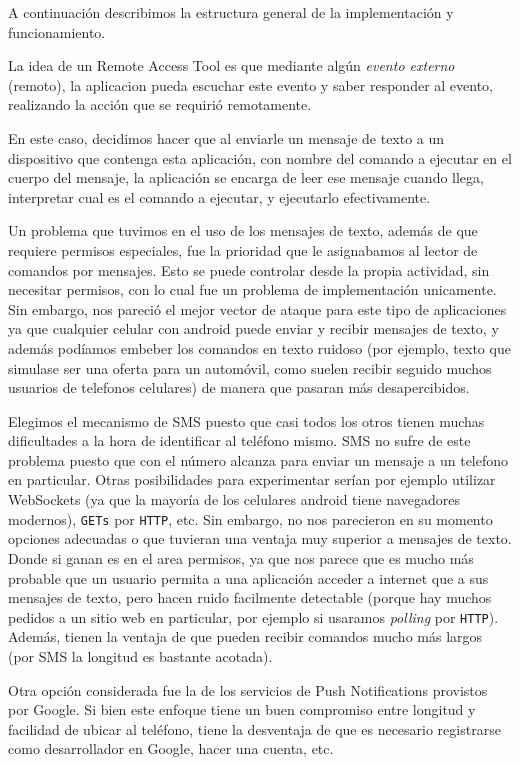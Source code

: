 A continuación describimos la estructura general de la implementación y funcionamiento.

La idea de un Remote Access Tool es que mediante algún \emph{evento externo} (remoto), la aplicacion pueda escuchar este evento y saber responder al evento, realizando la acción que se requirió remotamente.

En este caso, decidimos hacer que al enviarle un mensaje de texto a un dispositivo que contenga esta aplicación, con nombre del comando a ejecutar en el cuerpo del mensaje, la aplicación se encarga de leer ese mensaje cuando llega, interpretar cual es el comando a ejecutar, y ejecutarlo efectivamente.

Un problema que tuvimos en el uso de los mensajes de texto, además de que requiere permisos especiales, fue la prioridad que le asignabamos al
lector de comandos por mensajes. Esto se puede controlar desde la propia actividad, sin necesitar permisos, con lo cual fue un problema de implementación unicamente. Sin embargo, nos pareció el mejor vector de ataque para este tipo de aplicaciones ya que cualquier celular con
android puede enviar y recibir mensajes de texto, y además podíamos embeber los comandos en texto ruidoso (por ejemplo, texto que simulase ser
una oferta para un automóvil, como suelen recibir seguido muchos usuarios de telefonos celulares) de manera que pasaran más desapercibidos.

Elegimos el mecanismo de SMS puesto que casi todos los otros tienen muchas dificultades a la hora de identificar al teléfono mismo.  SMS no sufre de este problema puesto que con el número alcanza para enviar un mensaje a un telefono en particular. Otras posibilidades para experimentar serían por ejemplo utilizar WebSockets (ya que la mayoría de los celulares android tiene navegadores modernos), \texttt{GETs} por \texttt{HTTP}, etc. Sin embargo, no nos parecieron en su momento opciones adecuadas o que tuvieran una ventaja muy superior a mensajes de texto. Donde si ganan es en el area permisos, ya que nos parece que es mucho más probable que un usuario permita a una aplicación acceder a internet que a sus mensajes de texto, pero hacen ruido facilmente detectable (porque hay muchos pedidos a un sitio web en particular, por ejemplo si usaramos \textit{polling} por \texttt{HTTP}). Además, tienen la ventaja de que pueden recibir comandos mucho más largos (por SMS la longitud es bastante acotada).

Otra opción considerada fue la de los servicios de Push Notifications provistos por Google. Si bien este enfoque tiene un buen compromiso entre longitud y facilidad de ubicar al teléfono, tiene la desventaja de que es necesario registrarse como desarrollador en Google, hacer una cuenta, etc.

